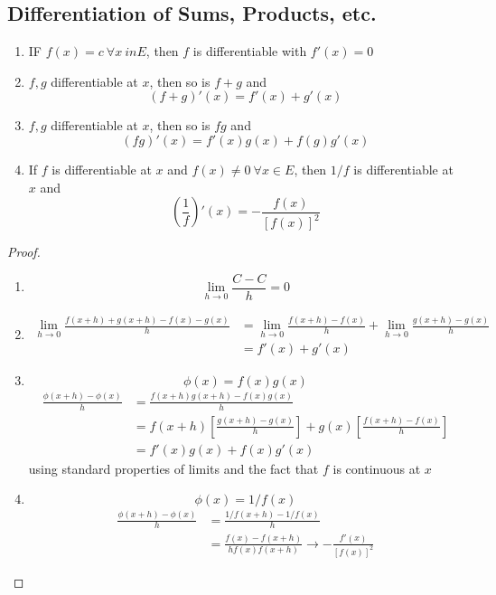 \subsection{Differentiation of Sums, Products, etc.}
\begin{prop}
\hfill{ }
\begin{enumerate}
    \item IF $f(x) = c \ \forall x\ in E$, then $f$ is differentiable with $f'(x) = 0$
    \item $f,g$ differentiable at $x$, then so is $f+g$ and
    \[(f+g)'(x) = f'(x) + g'(x)\]
    \item $f,g$ differentiable at $x$, then so is $fg$ and
    \[(fg)'(x) = f'(x)g(x) + f(g)g'(x)\]
    \item If $f$ is differentiable at $x$ and $f(x)\neq 0 \ \forall x\in E$, then $1/f$ is differentiable at $x$ and
    \[\left(\frac{1}{f}\right)'(x) = -\frac{f(x)}{[f(x)]^2}\]
\end{enumerate}
\begin{proof}
\hfill{ }
\begin{enumerate}
    \item \[\lim_{h\to 0} \frac{C-C}{h} = 0\]
    \item
    \begin{align*}
        \lim_{h\to 0} \frac{f(x+h) + g(x+h) - f(x) - g(x)}{h}&= \lim_{h\to 0} \frac{f(x+h) - f(x)}{h} + \lim_{h\to 0} \frac{g(x+h) - g(x)}{h} \\&= f'(x) + g'(x)
    \end{align*}
    \item \[\phi(x) = f(x)g(x)\]
    \begin{align*}
        \frac{\phi(x+h) - \phi(x)}{h} &= \frac{f(x+h)g(x+h) - f(x)g(x)}{h}\\
        &= f(x+h)\left [ \frac{g(x+h) - g(x)}{h}\right] + g(x)\left [ \frac{f(x+h) - f(x)}{h}\right]\\
        &= f'(x)g(x) + f(x)g'(x)
    \end{align*}
    using standard properties of limits and the fact that $f$ is continuous at $x$\item \[\phi(x) = 1/f(x)\]
    \begin{align*}
        \frac{\phi(x+h) - \phi(x)}{h} &= \frac{1/f(x+h) - 1/f(x)}{h}\\
        &= \frac{f(x) - f(x+h)}{hf(x)f(x+h)} \to -\frac{f'(x)}{[f(x)]^2}
    \end{align*}
\end{enumerate} 
\end{proof}
\end{prop}

